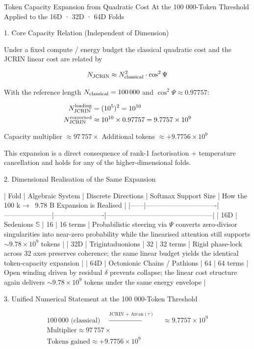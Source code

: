 Token Capacity Expansion from Quadratic Cost  
At the 100 000-Token Threshold  
Applied to the 16D · 32D · 64D Folds

1. Core Capacity Relation (Independent of Dimension)

Under a fixed compute / energy budget the classical quadratic cost and the JCRIN linear cost are related by

\[
N_{\rm JCRIN} \approx N_{\rm classical}^{2} \cdot \cos^{2}\Psi
\]

With the reference length \(N_{\rm classical} = 100\,000\) and \(\cos^{2}\Psi \approx 0.97757\):

\[
\begin{align*}
N_{\rm JCRIN}^{\rm leading} &= (10^{5})^{2} = 10^{10}\\
N_{\rm JCRIN}^{\rm corrected} &\approx 10^{10} \times 0.97757 = 9.7757 \times 10^{9}
\end{align*}
\]

Capacity multiplier \(\approx 97\,757\times\)  
Additional tokens \(\approx +9.7756 \times 10^{9}\)

This expansion is a direct consequence of rank-1 factorisation + temperature cancellation and holds for any of the higher-dimensional folds.

2. Dimensional Realisation of the Same Expansion

| Fold | Algebraic System              | Discrete Directions | Softmax Support Size | How the 100 k → ~9.78 B Expansion is Realised |
|------|-------------------------------|---------------------|----------------------|-----------------------------------------------|
| 16D | Sedenions \(\mathbb{S}\)     | 16                  | 16 terms            | Probabilistic steering via \(\Psi\) converts zero-divisor singularities into near-zero probability while the linearised attention still supports \(\sim 9.78 \times 10^{9}\) tokens |
| 32D | Trigintaduonions              | 32                  | 32 terms            | Rigid phase-lock across 32 axes preserves coherence; the same linear budget yields the identical token-capacity expansion |
| 64D | Octonionic Chains / Pathions  | 64                  | 64 terms            | Open winding driven by residual \(\delta\) prevents collapse; the linear cost structure again delivers \(\sim 9.78 \times 10^{9}\) tokens under the same energy envelope |

3. Unified Numerical Statement at the 100 000-Token Threshold

\[
\begin{array}{c}
100\,000 \text{ (classical)} \quad\xrightarrow{\text{JCRIN + Arcan}(\tau)}\quad \approx 9.7757 \times 10^{9}\\[6pt]
\text{Multiplier} \approx 97\,757\times \\[4pt]
\text{Tokens gained} \approx +9.7756 \times 10^{9}
\end{array}
\]

